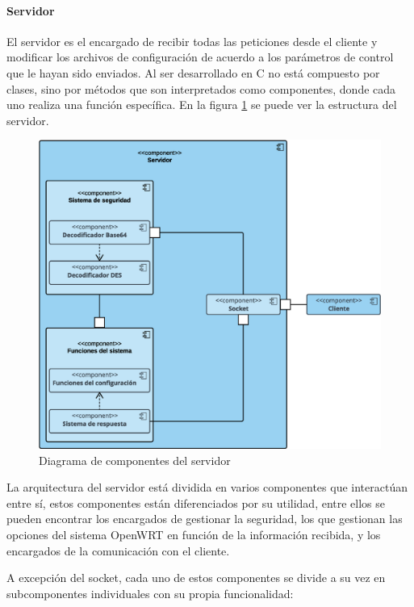 \documentclass[12pt, twoside]{article}
\begin{document}
            \paragraph{ Servidor}
            El servidor es el encargado de recibir todas las peticiones desde el cliente y modificar los archivos de configuración de acuerdo a los parámetros de control que le hayan sido enviados. Al ser desarrollado en C no está compuesto por clases, sino por métodos que son interpretados como componentes, donde cada uno realiza una función específica. En la figura \ref{fig:server_diagram} se puede ver la estructura del servidor.

            \begin{figure}[h!]
            \centering
                \includegraphics[scale=0.4]{server_diagram.eps}
                \caption{Diagrama de componentes del servidor}
                \label{fig:server_diagram}
            \end{figure}

            La arquitectura del servidor está dividida en varios componentes que interactúan entre sí, estos componentes están diferenciados por su utilidad, entre ellos se pueden encontrar los encargados de gestionar la seguridad, los que gestionan las opciones del sistema OpenWRT en función de la información recibida, y los encargados de la comunicación con el cliente.

            A excepción del socket, cada uno de estos componentes se divide a su vez en subcomponentes individuales con su propia funcionalidad:
\end{document}
